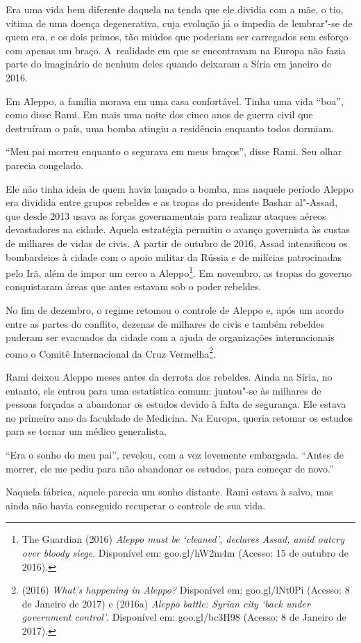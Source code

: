 Era uma vida bem diferente daquela na tenda que ele dividia com a mãe, o
tio, vítima de uma doença degenerativa, cuja evolução já o impedia de
lembrar"-se de quem era, e os dois primos, tão miúdos que poderiam ser
carregados sem esforço com apenas um braço. A~realidade em que se
encontravam na Europa não fazia parte do imaginário de nenhum deles
quando deixaram a Síria em janeiro de 2016.

Em Aleppo, a família morava em uma casa confortável. Tinha uma vida
``boa'', como disse Rami. Em mais uma noite dos cinco anos de guerra
civil que destruíram o país, uma bomba atingiu a residência enquanto todos
dormiam.

``Meu pai morreu enquanto o segurava em meus braços'', disse Rami. Seu
olhar parecia congelado.

Ele não tinha ideia de quem havia lançado a bomba, mas naquele período
Aleppo era dividida entre grupos rebeldes e as tropas do presidente
Bashar al"-Assad, que desde 2013 usava as forças governamentais para
realizar ataques aéreos devastadores na cidade. Aquela estratégia
permitiu o avanço governista às custas de milhares de vidas de civis.
A partir de outubro de 2016, Assad intensificou os bombardeios à
cidade com o apoio militar da Rússia e de milícias patrocinadas pelo
Irã, além de impor um cerco a Aleppo\footnote{ The Guardian (2016) \emph{Aleppo must be `cleaned',
declares Assad, amid outcry over bloody siege}. Disponível em:
goo.gl/hW2m4m
(Acesso: 15 de outubro de 2016).}. Em
novembro, as tropas do governo conquistaram áreas que antes estavam sob o poder
rebeldes.

No fim de dezembro, o regime retomou o controle de Aleppo e, após um
acordo entre as partes do conflito, dezenas de milhares de civis e
também rebeldes puderam ser evacuados da cidade com a ajuda de
organizações internacionais como o Comitê Internacional da Cruz
Vermelha\footnote{  (2016) \emph{What}\emph{'}\emph{s happening in
Aleppo?} Disponível em:
goo.gl/lNt0Pi
(Acesso: 8 de Janeiro
de 2017) e  (2016a) \emph{Aleppo battle: Syrian city}
\emph{`}\emph{back under government control}\emph{'}. Disponível em:
goo.gl/bc3H98
(Acesso: 8 de Janeiro
de 2017).}.

Rami deixou Aleppo meses antes da derrota dos rebeldes. Ainda na Síria,
no entanto, ele entrou para uma estatística comum: juntou"-se às milhares
de pessoas forçadas a abandonar os estudos devido à falta de segurança.
Ele estava no primeiro ano da faculdade de Medicina. Na Europa, queria
retomar os estudos para se tornar um médico generalista.

``Era o sonho do meu pai'', revelou, com a voz levemente embargada.
``Antes de morrer, ele me pediu para não abandonar os estudos, para
começar de novo.''

Naquela fábrica, aquele parecia um sonho distante. Rami estava à salvo,
mas ainda não havia conseguido recuperar o controle de sua vida.
